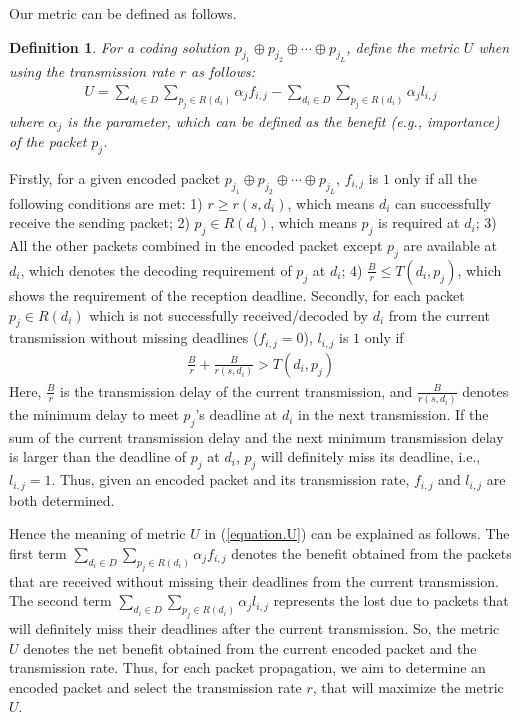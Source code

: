 \documentclass[journal]{IEEEtran}
\newtheorem{DD}{Definition}
\begin{document}
Our metric can be defined as follows.
\begin{DD}
For a coding solution $p_{j_1}\oplus p_{j_2}\oplus \cdots \oplus p_{j_L}$, define the metric $U$ when using the transmission rate $r$ as follows:
\vspace{-0.05in}
{\small\begin{eqnarray}\label{equation.U}
U=\sum_{d_i\in D}\sum_{p_j\in R(d_i)} \alpha_j f_{i,j}- \sum_{d_i\in D}\sum_{p_j\in R(d_i)}\alpha_j l_{i,j}
\end{eqnarray}}
where $\alpha_j$ is the parameter, which can be defined as the benefit (e.g., importance) of the packet $p_j$.
\end{DD}\vspace{-0.05in}

Firstly, for a given encoded packet $p_{j_1}\oplus p_{j_2}\oplus \cdots \oplus p_{j_L}$, $f_{i,j}$ is $1$ only if all the following conditions are met: 1) $r\geq r(s,d_i)$, which means $d_i$ can successfully receive the sending packet; 2) $p_j\in R(d_i)$, which means $p_j$ is required at $d_i$; 3) All the other packets combined in the encoded packet except $p_j$ are available at $d_i$, which denotes the decoding requirement of $p_j$ at $d_i$; 4) $\frac{B}{r}\leq T(d_i,p_j)$, which shows the requirement of the reception deadline.
Secondly, for each packet $p_j\in R(d_i)$ which is not successfully received/decoded by $d_i$ from the current transmission without missing deadlines ($f_{i,j}=0$), $l_{i,j}$ is $1$ only if
{\small \begin{eqnarray} \label{eq.miss}
\frac{B}{r}+\frac{B}{r(s,d_i)}>T(d_i,p_j)
\end{eqnarray}}
Here, $\frac{B}{r}$ is the transmission delay of the current transmission, and $\frac{B}{r(s,d_i)}$ denotes the minimum delay to meet $p_j$'s deadline at $d_i$ in the next transmission. If the sum of the current transmission delay and the next minimum transmission delay is larger than the deadline of $p_j$ at $d_i$, $p_j$ will definitely miss its deadline, i.e., $l_{i,j}=1$.
Thus, given an encoded packet and its transmission rate, $f_{i,j}$ and $l_{i,j}$ are both determined.

Hence the meaning of metric $U$ in (\ref{equation.U}) can be explained as follows.
The first term $\sum_{d_i\in D}\sum_{p_j\in R(d_i)}\alpha_j f_{i,j}$ denotes the benefit obtained from the packets that are received without missing their deadlines from the current transmission. The second term $\sum_{d_i\in D}\sum_{p_j\in R(d_i)}\alpha_j l_{i,j}$ represents the lost due to packets that will definitely miss their deadlines after the current transmission. So, the metric $U$ denotes the net benefit obtained from the current encoded packet and the transmission rate.
Thus, for each packet propagation, we aim to determine an encoded packet and select the transmission rate $r$, that will maximize the metric $U$.
\end{document}
